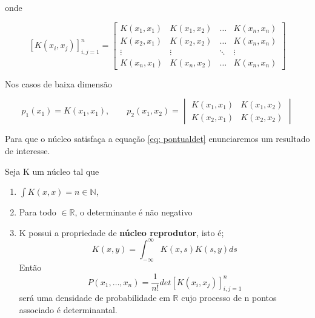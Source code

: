 onde

\[
[K(x_i,x_j)]_{i,j=1}^{n} = 
\begin{bmatrix}
	K(x_1, x_1) & K(x_1, x_2) & \dots & K(x_n, x_n) \\
	K(x_2, x_1) & K(x_2, x_2) & \dots & K(x_n, x_n) \\
	\vdots & \vdots & \ddots & \vdots \\
	K(x_n, x_1) & K(x_n, x_2) & \dots & K(x_n, x_n)
\end{bmatrix}
\]

Nos casos de baixa dimensão

\[
p_1(x_1) = K(x_1,x_1), \quad \quad p_2(x_1,x_2) =
\begin{vmatrix}
	K(x_1, x_1) & K(x_1, x_2) \\
	K(x_2, x_1) & K(x_2, x_2)
\end{vmatrix}
\]

Para que o núcleo satisfaça a equação \ref{eq: pontualdet} enunciaremos um resultado de interesse.

\begin{theorem}
	Seja K um núcleo tal que
	\begin{enumerate}[label=(\alph*)]
		\item $\int K(x,x) = n \in \mathbb{N}$,
		\item Para todo  $\in \mathbb{R}$, o determinante é não negativo
		\item K possui a propriedade de \textbf{núcleo reprodutor}, isto é;
		\[
		K(x,y) = \int_{-\infty}^{\infty} K(x,s) K(s,y) ds
		\]
		Então
		\[
		P(x_1,\dots, x_n) = \frac{1}{n!} det[K(x_i, x_j)]_{i,j=1}^{n}
		\]
		será uma densidade de probabilidade em $\mathbb{R}$ cujo processo de n pontos associado é determinantal.
	\end{enumerate}
\end{theorem}

